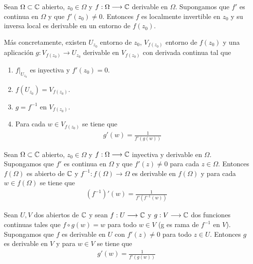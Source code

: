 \begin{teo}
    Sean $\Omega \subset \mathbb{C}$ abierto, $z_0 \in \Omega$ y $f: \Omega \longrightarrow \mathbb{C}$ derivable en $\Omega$. Supongamos que $f'$ es continua en $\Omega$ y que $f'(z_0) \not = 0$. Entonces $f$ es localmente invertible en $z_0$ y su inversa local es derivable en un entorno de $f(z_0)$.

    Más concretamente, existen $U_{z_0}$ entorno de $z_0$, $V_{f(z_0)}$ entorno de $f(z_0)$ y una aplicación $g : V_{f(z_0)} \longrightarrow U_{z_0}$ derivable en $V_{f(z_0)}$ con derivada continua tal que
    \begin{enumerate}
        \item $f|_{U_{z_0}}$ es inyectiva y $f'(z_0) = 0$.
        \item $f(U_{z_0}) = V_{f(z_0)}$.
        \item $g = f^{-1}$ en $V_{f(z_0)}$.
        \item Para cada $w \in V_{f(z_0)}$ se tiene que
              \begin{align*}
                  g'(w) = \frac{1}{f'(g(w))}
              \end{align*}
    \end{enumerate}
\end{teo}
\begin{teo}
    Sean $\Omega \subset \mathbb{C}$ abierto, $z_0 \in \Omega$ y $f: \Omega \longrightarrow \mathbb{C}$ inyectiva y derivable en $\Omega$. Supongamos que $f'$ es continua en $\Omega$ y que $f'(z) \not = 0$ para cada $z \in \Omega$. Entonces $f(\Omega)$ es abierto de $\mathbb{C}$ y $f^{-1} : f(\Omega) \longrightarrow \Omega$ es derivable en $f(\Omega)$ y para cada $w \in f(\Omega)$ se tiene que
    \begin{align*}
        \left(f^{-1}\right)'(w) = \frac{1}{f'\left(f^{-1}(w)\right)}
    \end{align*}
\end{teo}

\begin{teo}
    Sean $U,V$ dos abiertos de $\mathbb{C}$ y sean $f: U \longrightarrow \mathbb{C}$ y $g: V \longrightarrow \mathbb{C}$ dos funciones continuas tales que $f \circ g (w) = w$ para todo $w \in V$ (g es rama de $f^{-1}$ en $V$). Supongamos que $f$ es derivable en $U$ con $f'(z) \not = 0$ para todo $z \in U$. Entonces $g$ es derivable en $V$ y para $w \in V$ se tiene que
    \begin{align*}
        g'(w) = \frac{1}{f'(g(w))}
    \end{align*}
\end{teo}

